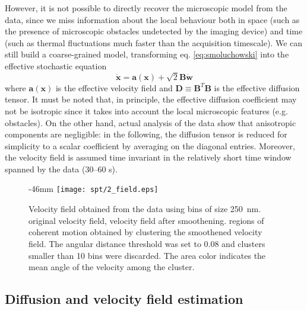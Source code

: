 However, it is not possible to directly recover the microscopic model from the  data, since we miss information about the local behaviour both in space (such as the presence of microscopic obstacles undetected by the imaging device) and time (such as thermal fluctuations much faster than the acquisition timescale). We can still build a coarse-grained model, transforming eq. \ref{eq:smoluchowski} into the effective stochastic equation
\begin{equation} \label{eq:effective}
 \dot{\bm{x}} = \bm{a}(\bm{x}) + \sqrt{2}\bm{B} \dot{\bm{w}}
\end{equation}
where $\bm{a}(\bm{x})$ is the effective velocity field and $\bm{D} \equiv \bm{B}^T\bm{B}$ is the effective diffusion tensor. It must be noted that, in principle, the effective diffusion coefficient may not be isotropic since it takes into account the local microscopic features (e.g. obstacles). On the other hand, actual analysis of the data show that anisotropic components are negligible: in the following, the diffusion tensor is reduced for simplicity to a scalar coefficient by averaging on the diagonal entries. Moreover, the velocity field is assumed time invariant in the relatively short time window spanned by the  data (30--60 s).

\begin{figure}
    \begin{adjustwidth*}{}{-46mm}
      \texttt{[image: spt/2\_field.eps]}%
      {{\label{fig:vf_original}}%
      {\label{fig:vf_smooth}}%
      {\label{fig:vf_cdr}}}%
      \caption{Velocity field obtained from the  data using bins of size \SI{250}{\nano\metre}. \enspace original velocity field, \enspace velocity field after smoothening. \enspace regions of coherent motion obtained by clustering the smoothened velocity field. The angular distance threshold was set to \SI{0.08}{} and clusters smaller than 10 bins were discarded. The area color indicates the mean angle of the velocity among the cluster.\label{fig:vf}}
  \end{adjustwidth*}
\end{figure}


\subsection{Diffusion and velocity field estimation}

